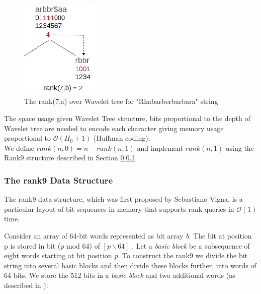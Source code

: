 \documentclass[11pt,a4paper]{report}
\begin{document}
\begin{figure}[H]
\centering
\includegraphics[width=3.75cm]{pictures/rank74.png}
\caption{The rank(7,a) over Wavelet tree for "Rhabarberbarbara" string }
\label{rank1}
\end{figure}

The space usage given Wavelet Tree structure, bits proportional to the 
depth of  Wavelet tree are needed to encode each character giving memory 
usage proportional to $\mathcal{O}(H_{0}+1)$ (Huffman coding).\\

We define \emph{$rank(n,0)= n- rank(n,1)$} and implement 
\emph{$rank(n,1)$} using the Rank9 structure \cite{rank9} 
described in Section \ref{The rank9 Data Structure}.



\subsubsection{The rank9 Data Structure} 
\label{The rank9 Data Structure}


The rank9 data structure, which was first proposed by Sebastiano
Vigna\cite{rank9}, is a particular layout of bit sequences in memory
that supports rank queries in $\mathcal{O}(1)$ time.

Consider an array of 64-bit words represented as bit array 
\emph{b}. The bit at position p is stored in bit (\emph{p} 
mod 64) of $ [p \backslash 64]$ \cite{rank9}. Let a \emph
{basic block} be a subsequence of eight words starting at 
bit position \emph{p}. To construct the rank9  we divide 
the bit string into several basic blocks and then divide 
these blocks further, into words of 64 bits. We store the 
512 bits in a \emph{basic block} and two additional words 
(as described in \cite{rank9}):
\end{document}

